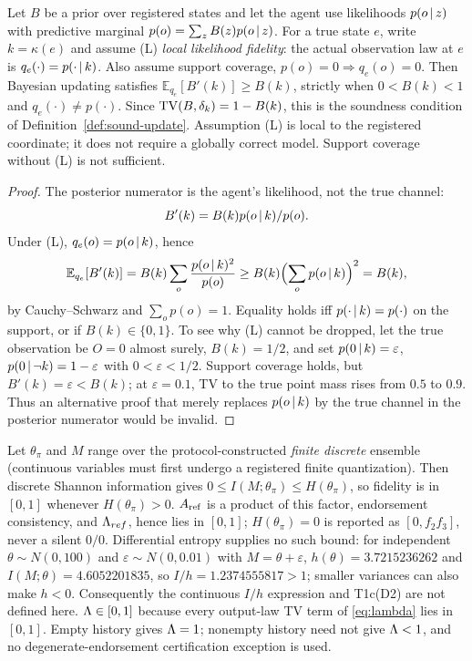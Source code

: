 \begin{lemma}
\label{lem:sound-update}
Let $B$ be a prior over registered states and let the agent use likelihoods
$p(o\,|\, z)$ with predictive marginal $p(o)=\sum_zB(z)p(o\,|\, z)$. For a
true state $e$, write $k=\kappa(e)$ and assume
\textup{(L)} \emph{local likelihood fidelity}: the actual observation law at
$e$ is $q_e(\cdot)=p(\cdot\,|\, k)$. Also assume support coverage,
$p(o)=0\Rightarrow q_e(o)=0$. Then Bayesian updating satisfies
$\mathbb{E}_{q_e}[B'(k)]\ge B(k)$, strictly when $0<B(k)<1$ and
$q_e(\cdot)\neq p(\cdot)$. Since $\mathrm{TV}(B,\delta_k)=1-B(k)$, this is the
soundness condition of Definition~\ref{def:sound-update}. Assumption (L) is
local to the registered coordinate; it does not require a globally correct
model. Support coverage without (L) is not sufficient.
\end{lemma}
\begin{proof}
The posterior numerator is the agent's likelihood, not the true channel:
\[
B'(k)=B(k)p(o\,|\, k)/p(o).
\]
Under (L), $q_e(o)=p(o\,|\, k)$, hence
\[
\mathbb{E}_{q_e}[B'(k)]
=B(k)\sum_o\frac{p(o\,|\, k)^2}{p(o)}
\ge B(k)\Bigl(\sum_op(o\,|\, k)\Bigr)^2=B(k),
\]
by Cauchy--Schwarz and $\sum_op(o)=1$. Equality holds iff $p(\cdot\,|\,
k)=p(\cdot)$ on the support, or if $B(k)\in\{0,1\}$. To see why (L) cannot be dropped,
let the true observation be $O=0$ almost surely, $B(k)=1/2$, and set
$p(0\,|\, k)=\varepsilon$, $p(0\,|\,\neg k)=1-\varepsilon$ with
$0<\varepsilon<1/2$. Support coverage holds, but $B'(k)=\varepsilon<B(k)$;
at $\varepsilon=0.1$, TV to the true point mass rises from $0.5$ to $0.9$.
Thus an alternative proof that merely replaces $p(o\,|\, k)$ by the true
channel in the posterior numerator would be invalid.
\end{proof}

\begin{proposition}\label{prop:wd-ref}
Let $\theta_\pi$ and $M$ range over the protocol-constructed \emph{finite
discrete} ensemble (continuous variables must first undergo a registered
finite quantization). Then discrete Shannon information gives
$0\le I(M;\theta_\pi)\le H(\theta_\pi)$, so fidelity is in $[0,1]$ whenever
$H(\theta_\pi)>0$. $A_{\mathrm{ref}}$ is a product of this factor, endorsement
consistency, and $\Lambda_{ref}$, hence lies in $[0,1]$; $H(\theta_\pi)=0$ is
reported as $[0,f_2f_3]$, never a silent $0/0$. Differential entropy supplies
no such bound: for independent $\theta\sim N(0,100)$ and
$\varepsilon\sim N(0,0.01)$ with $M=\theta+\varepsilon$,
$h(\theta)=3.7215236262$ and $I(M;\theta)=4.6052201835$, so
$I/h=1.2374555817>1$; smaller variances can also make $h<0$. Consequently
the continuous $I/h$ expression and T1c(D2) are not defined here.
$\Lambda\in[0,1]$ because every output-law TV term of \eqref{eq:lambda} lies in
$[0,1]$. Empty history gives $\Lambda=1$; nonempty history need not give
$\Lambda<1$, and no degenerate-endorsement certification exception is used.
\end{proposition}

